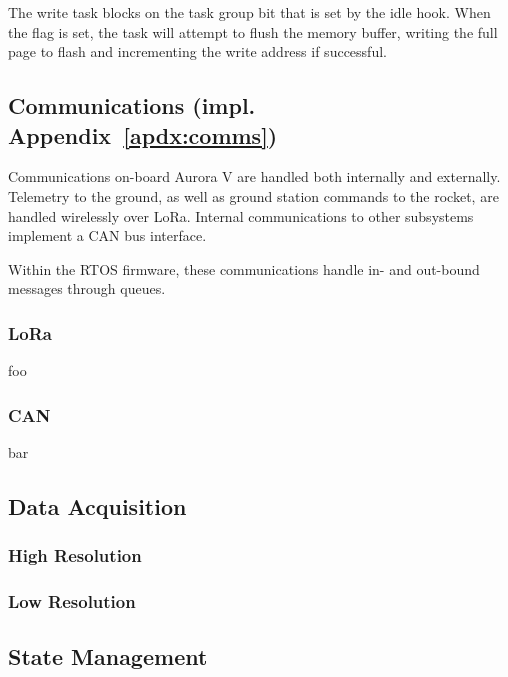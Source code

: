 The write task blocks on the task group bit that is set by the idle hook. When the flag is set, the task will attempt to flush the memory buffer, writing the full page to flash and incrementing the write address if successful. 

\subsection{Communications \normalfont\small{(impl. Appendix~\ref{apdx:comms})}}
Communications on-board Aurora V are handled both internally and externally. Telemetry to the ground, as well as ground station commands to the rocket, are handled wirelessly over LoRa. Internal communications to other subsystems implement a CAN bus interface. 

Within the RTOS firmware, these communications handle in- and out-bound messages through queues.

\subsubsection{LoRa}
foo

\subsubsection{CAN}
bar

\subsection{Data Acquisition}
\subsubsection{High Resolution}
\subsubsection{Low Resolution}

\subsection{State Management}

